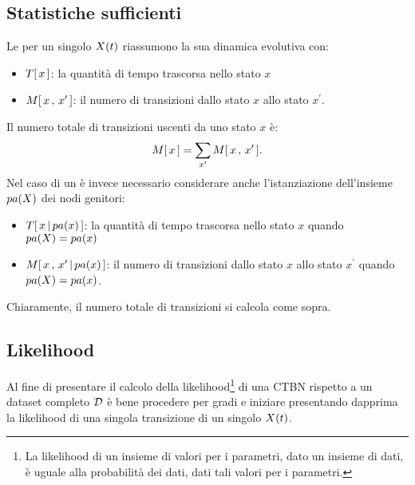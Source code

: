 \subsection{Statistiche sufficienti}
\label{sec:ctbn-sufficient-stats}
Le \emph{\stats{}} per un singolo \mprocess*{} \omog*{} $\mathnormal{X}(t)$ riassumono la sua dinamica evolutiva con:
\begin{itemize}
    \item $T[\,x\,]$: la quantità di tempo trascorsa nello stato $x$
    \item $\mstat[x]{x^\prime}$: il numero di transizioni dallo stato $x$ allo stato $x^\prime$.
\end{itemize}

Il numero totale di transizioni uscenti da uno stato $x$ è:
\[
\mstat{x}=\sum_{x^\prime}\mstat[x]{x^\prime}\text{.}
\]
Nel caso di un \mprocess*{} \cond*{} è invece necessario considerare anche l'istanziazione dell'insieme $pa(\mathnormal{X})$ dei nodi genitori:
\begin{itemize}
    \item $T[\,x\,\arrowvert\,pa(x)\,]$: la quantità di tempo trascorsa nello stato $x$ quando $pa(\mathnormal{X})=pa(x)$
    \item $\mstat[x]{x^\prime\,\arrowvert\,pa(x)}$: il numero di transizioni dallo stato $x$ allo stato $x^\prime$ quando $pa(\mathnormal{X})=pa(x)$.
\end{itemize}
Chiaramente, il numero totale di transizioni si calcola come sopra.

\subsection{Likelihood}
\label{sec:ctbn-likelihood}
Al fine di presentare il calcolo della likelihood\footnote{La likelihood di un insieme di valori per i parametri, dato un insieme di dati, è uguale alla probabilità dei dati, dati tali valori per i parametri.} di una \acs{CTBN} rispetto a un dataset completo $\mathcal{D}$ è bene procedere per gradi e iniziare presentando dapprima la likelihood di una singola transizione di un singolo \mprocess*{} \omog*{} $\mathnormal{X}(t)$.

